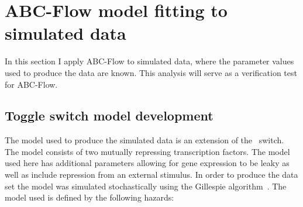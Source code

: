 %
%
\clearpage
\section{ABC-Flow model fitting to simulated data }



In this section I apply ABC-Flow to simulated data, where the parameter values used to produce the data are known. This analysis will serve as a verification test for ABC-Flow. 

\subsection{Toggle switch model development}
The model used to produce the simulated data is an extension of the~\textcite{Gardner:2000vha} switch. The model consists of two mutually repressing transcription factors. The model used here has additional parameters allowing for gene expression to be leaky as well as include repression from an external stimulus. In order to produce the data set the model was simulated stochastically using the Gillespie algorithm~\autocite{Gillespie:1977ww}. The model used is defined by the following hazards:

